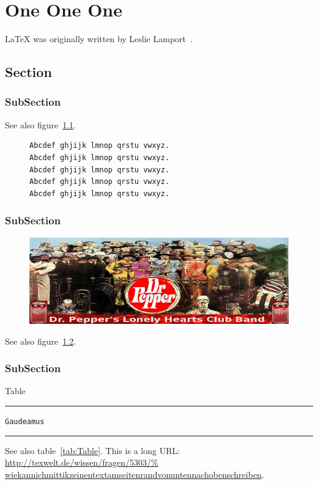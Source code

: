

\chapter{One One One}
\LaTeX{} was originally written by Leslie Lamport~\cite{lamport94}.
\gaudeamus
\section{Section}
\lipsum[1]
\subsection{SubSection}
\lipsum[1]
See also figure~\ref{document}.
\begin{figure}[h]
\begin{verbatim}
Abcdef ghjijk lmnop qrstu vwxyz.
Abcdef ghjijk lmnop qrstu vwxyz.
Abcdef ghjijk lmnop qrstu vwxyz.
Abcdef ghjijk lmnop qrstu vwxyz.
Abcdef ghjijk lmnop qrstu vwxyz.
\end{verbatim}
\caption[FIG LIST AAAAA]{\gaudeamus}\label{document}
\end{figure}
\subsection{SubSection}
\lipsum[1]
\begin{figure}[h]
\begin{center}
\vspace*{15pt}
\includegraphics[scale=0.51]{book.jpg}
\end{center}
\caption[FIG LIST BBBBB]{\gaudeamus}\label{fig:figure}
\end{figure}
\lipsum[1]
See also figure~\ref{fig:figure}.
\subsection{SubSection}
\lipsum[1]
\begin{table}[h]
\caption{Table} \label{tab:Table}
\hrule
\begin{description}
\item [\normalfont\texttt{Gaudeamus}] \gaudeamus
\end{description}
\hrule
\end{table}
\lipsum[1]
See also table~\ref{tab:Table}.
This is a long URL: \url{http://texwelt.de/wissen/fragen/5303/%
wiekannichmittikzeinentextamseitenrandvonuntennachobenschreiben}.

